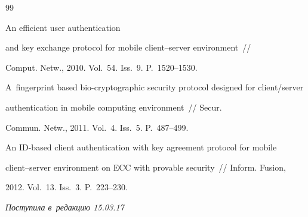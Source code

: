 {{\begin{thebibliography}{99}


 An efficient user authentication 


and key exchange protocol for mobile client--server environment~/\!\!/ 


Comput. Netw., 2010. Vol.~54. Iss.~9. P.~1520--1530.









A~fingerprint based bio-cryptographic security protocol designed for client/server 


authentication in mobile computing environment~/\!\!/ Secur. 


Commun. Netw., 2011. Vol.~4. Iss.~5. P.~487--499.









An ID-based client authentication with key agreement protocol for mobile 


client--server environment on ECC with provable security~/\!\!/ Inform. Fusion, 


2012. Vol.~13. Iss.~3. P.~223--230.


       \end{thebibliography}


} }








\vspace*{-3pt}





\hfill{\small\textit{Поступила в~редакцию 15.03.17}}





























